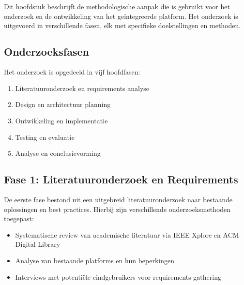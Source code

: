 
\chapter{}
\label{ch:methodologie}

Dit hoofdstuk beschrijft de methodologische aanpak die is gebruikt voor het onderzoek en de ontwikkeling van het geïntegreerde platform. Het onderzoek is uitgevoerd in verschillende fasen, elk met specifieke doelstellingen en methoden.

\section{Onderzoeksfasen}
\label{sec:onderzoeksfasen}

Het onderzoek is opgedeeld in vijf hoofdfasen:

\begin{enumerate}
    \item Literatuuronderzoek en requirements analyse
    \item Design en architectuur planning
    \item Ontwikkeling en implementatie
    \item Testing en evaluatie
    \item Analyse en conclusievorming
\end{enumerate}

\section{Fase 1: Literatuuronderzoek en Requirements}
\label{sec:fase1}

De eerste fase bestond uit een uitgebreid literatuuronderzoek naar bestaande oplossingen en best practices. Hierbij zijn verschillende onderzoeksmethoden toegepast:

\begin{itemize}
    \item Systematische review van academische literatuur via IEEE Xplore en ACM Digital Library
    \item Analyse van bestaande platforms en hun beperkingen
    \item Interviews met potentiële eindgebruikers voor requirements gathering
\end{itemize}


